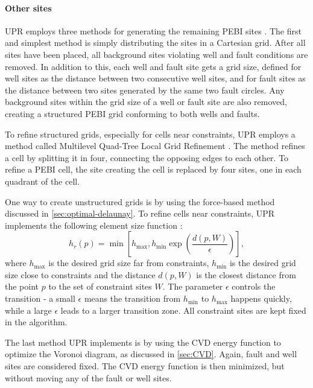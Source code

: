 \paragraph{Other sites}
UPR employs three methods for generating the remaining PEBI sites \cite{UPR_thesis}. The first and simplest method is simply distributing the sites in a Cartesian grid. After all sites have been placed, all background sites violating well and fault conditions are removed. In addition to this, each well and fault site gets a grid size, defined for well sites as the distance between two consecutive well sites, and for fault sites as the distance between two sites generated by the same two fault circles. Any background sites within the grid size of a well or fault site are also removed, creating a structured PEBI grid conforming to both wells and faults.

To refine structured grids, especially for cells near constraints, UPR employs a method called Multilevel Quad-Tree Local Grid Refinement \cite[pp.49]{UPR_thesis}. The method refines a cell by splitting it in four, connecting the opposing edges to each other. To refine a PEBI cell, the site creating the cell is replaced by four sites, one in each quadrant of the cell.

One way to create unstructured grids is by using the force-based method discussed in \autoref{sec:optimal-delaunay}. To refine cells near constraints, UPR implements the following element size function \cite[Equation 4.2]{UPR_thesis}:
\begin{equation}
    h_r(p) = \min \left[
        h_{\max}, h_{\min} \exp \left(
            \frac{d(p, W)}{\epsilon}
        \right) \right],
\end{equation}
where $h_{\max}$ is the desired grid size far from constraints, $h_{\min}$ is the desired grid size close to constraints and the distance $d(p, W)$ is the closest distance from the point $p$ to the set of constraint sites $W$. The parameter $\epsilon$ controls the transition - a small $\epsilon$ means the transition from $h_{\min}$ to $h_{\max}$ happens quickly, while a large $\epsilon$ leads to a larger transition zone. All constraint sites are kept fixed in the algorithm.

The last method UPR implements is by using the CVD energy function to optimize the Voronoi diagram, as discussed in \autoref{sec:CVD}. Again, fault and well sites are considered fixed. The CVD energy function is then minimized, but without moving any of the fault or well sites.


